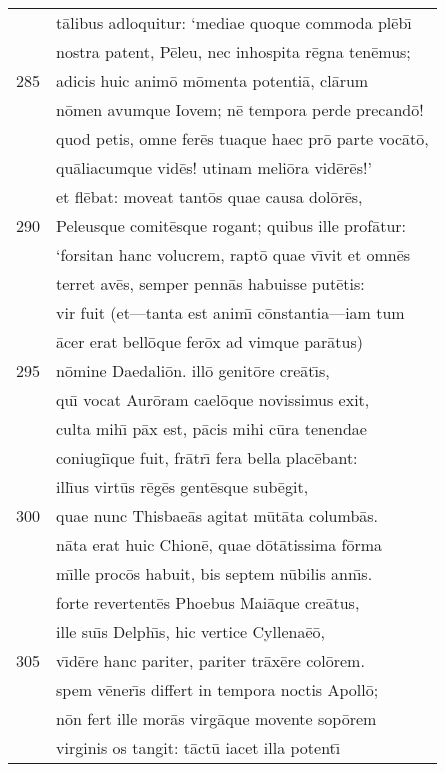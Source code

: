 \documentclass[paper=6in:9in,pagesize=pdftex,
               headinclude=on,footinclude=on,12pt]{scrbook}
\begin{document}
\begin{longtable}[p]{ r l }
 & t\=alibus adloquitur: `mediae quoque commoda pl\=eb\={\i}\\ 
 & nostra patent, P\=eleu, nec inhospita r\=egna ten\=emus;\\ 
285 & adicis huic anim\=o m\=omenta potenti\=a, cl\=arum\\ 
 & n\=omen avumque Iovem; n\=e tempora perde precand\=o!\\ 
 & quod petis, omne fer\=es tuaque haec pr\=o parte voc\=at\=o,\\ 
 & qu\=aliacumque vid\=es! utinam meli\=ora vid\=er\=es!'\\ 
 & et fl\=ebat: moveat tant\=os quae causa dol\=or\=es,\\ 
290 & Peleusque comit\=esque rogant; quibus ille prof\=atur:\\ 
 & `forsitan hanc volucrem, rapt\=o quae v\={\i}vit et omn\=es\\ 
 & terret av\=es, semper penn\=as habuisse put\=etis:\\ 
 & vir fuit (et—tanta est anim\={\i} c\=onstantia—iam tum\\ 
 & \=acer erat bell\=oque fer\=ox ad vimque par\=atus)\\ 
295 & n\=omine Daedali\=on. ill\=o genit\=ore cre\=at\={\i}s,\\ 
 & qu\={\i} vocat Aur\=oram cael\=oque novissimus exit,\\ 
 & culta mih\={\i} p\=ax est, p\=acis mihi c\=ura tenendae\\ 
 & coniugi\={\i}que fuit, fr\=atr\={\i} fera bella plac\=ebant:\\ 
 & ill\={\i}us virt\=us r\=eg\=es gent\=esque sub\=egit,\\ 
300 & quae nunc Thisbae\=as agitat m\=ut\=ata columb\=as.\\ 
 & n\=ata erat huic Chion\=e, quae d\=ot\=atissima f\=orma\\ 
 & m\={\i}lle proc\=os habuit, bis septem n\=ubilis ann\={\i}s.\\ 
 & forte revertent\=es Phoebus Mai\=aque cre\=atus,\\ 
 & ille su\={\i}s Delph\={\i}s, hic vertice Cyllena\=e\=o,\\ 
305 & v\={\i}d\=ere hanc pariter, pariter tr\=ax\=ere col\=orem.\\ 
 & spem v\=ener\={\i}s differt in tempora noctis Apoll\=o;\\ 
 & n\=on fert ille mor\=as virg\=aque movente sop\=orem\\ 
 & virginis os tangit: t\=act\=u iacet illa potent\={\i}\\ 

\end{longtable}
\end{document}
